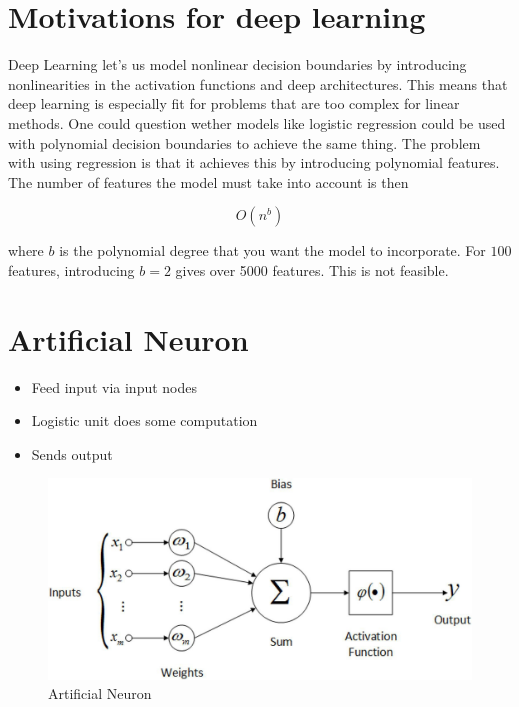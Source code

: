 \section{Motivations for deep learning}

Deep Learning let's us model nonlinear decision boundaries by introducing
nonlinearities in the activation functions and deep architectures. This means 
that deep learning is especially fit for problems that are too complex for 
linear methods. One could question wether models like logistic regression could
be used with polynomial decision boundaries to achieve the same thing. 
The problem with using regression is that it achieves this by introducing
polynomial features. The number of features the model must take into account
is then 

\begin{equation*}
    O(n^b)
\end{equation*}

where $b$ is the polynomial degree that you want the model to incorporate. 
For $100$ features, introducing $b = 2$ gives over 5000 features. This is not
feasible. 

\section{Artificial Neuron}
\begin{itemize}
    \item Feed input via input nodes
    \item Logistic unit does some computation
    \item Sends output
\end{itemize}

\bigskip
\begin{figure}[H]
\centering
\includegraphics[scale=0.25]{figures/artificialneuron.jpeg}
\caption{Artificial Neuron}
\end{figure}

